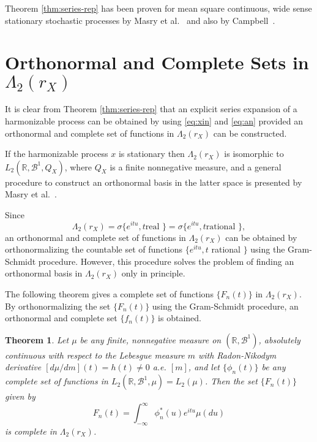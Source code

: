 \documentclass{article}
\newtheorem{theorem}{Theorem}
\begin{document}
Theorem \ref{thm:series-rep} has been proven for mean square continuous, wide
sense stationary stochastic processes by Masry et al.~{\cite{masry1968}} and
also by Campbell~{\cite{campbell1969}}.

\section{Orthonormal and Complete Sets in $\Lambda_2
(r_X)$}\label{sec:orthonormal-sets}

It is clear from Theorem \ref{thm:series-rep} that an explicit series
expansion of a harmonizable process can be obtained by using \eqref{eq:xin}
and \eqref{eq:an} provided an orthonormal and complete set of functions in
$\Lambda_2 (r_X)$ can be constructed.

If the harmonizable process $x$ is stationary then $\Lambda_2 (r_X)$ is
isomorphic to $L_2 (\mathbb{R}, \mathscr{B}^1, Q_X)$, where $Q_X$ is a finite
nonnegative measure, and a general procedure to construct an orthonormal basis
in the latter space is presented by Masry et al.~{\cite{masry1968}}.

Since
\begin{equation}
  \Lambda_2 (r_X) = \sigma \{e^{itu}, t \text{real } \} = \sigma \{e^{itu}, t
  \text{rational } \}, \label{eq:span}
\end{equation}
an orthonormal and complete set of functions in $\Lambda_2 (r_X)$ can be
obtained by orthonormalizing the countable set of functions $\{e^{itu}, t$
rational $\}$ using the Gram-Schmidt procedure. However, this procedure solves
the problem of finding an orthonormal basis in $\Lambda_2 (r_X)$ only in
principle.

The following theorem gives a complete set of functions $\{F_n (t)\}$ in
$\Lambda_2 (r_X)$. By orthonormalizing the set $\{F_n (t)\}$ using the
Gram-Schmidt procedure, an orthonormal and complete set $\{f_n (t)\}$ is
obtained.

\begin{theorem}
  \label{thm:complete-set}Let $\mu$ be any finite, nonnegative measure on
  $(\mathbb{R}, \mathscr{B}^1)$, absolutely continuous with respect to the
  Lebesgue measure $m$ with Radon-Nikodym derivative $[d \mu / dm] (t) = h (t)
  \neq 0$ a.e. $[m]$, and let $\{\phi_n (t)\}$ be any complete set of
  functions in $L_2 (\mathbb{R}, \mathscr{B}^1, \mu) = L_2 (\mu)$. Then the
  set $\{F_n (t)\}$ given by
  \begin{equation}
    F_n (t) = \int_{- \infty}^{\infty} \phi_n^{\ast} (u) e^{itu} \mu (du)
    \label{eq:Fn}
  \end{equation}
  is complete in $\Lambda_2 (r_X)$.
\end{theorem}
\end{document}
